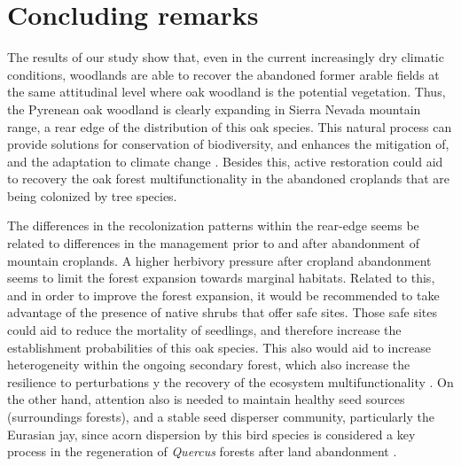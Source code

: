 \section{Concluding remarks}\label{sec:coloniza:Conclusion}
The results of our study show that, even in the current increasingly dry climatic conditions, \Qp woodlands are able to recover the abandoned former arable fields at the same attitudinal level where oak woodland is the potential vegetation. Thus, the Pyrenean oak woodland is clearly expanding in Sierra Nevada mountain range, a rear edge of the distribution of this oak species. This natural process can provide solutions for conservation of biodiversity, and enhances the mitigation of, and the adaptation to climate change \autocites[][and references therein]{Chazdonetal2020FosteringNatural}. Besides this, active restoration could aid to recovery the oak forest multifunctionality \autocite{CruzAlonsoetal2019LongTerm} in the abandoned croplands that are being colonized by tree species.

The differences in the recolonization patterns within the rear-edge seems be related to differences in the management prior to and after abandonment of mountain croplands. A higher herbivory pressure after cropland abandonment seems to limit the forest expansion towards marginal habitats. Related to this, and in order to improve the forest expansion, it would be recommended to take advantage of the presence of native shrubs that offer safe sites. Those safe sites could aid to reduce the mortality of \Qp seedlings, and therefore increase the establishment probabilities of this oak species. This also would aid to increase heterogeneity within the ongoing secondary forest, which also increase the resilience to perturbations y the recovery of the ecosystem multifunctionality \autocite{Stritihetal2021ImpactLanduse, CruzAlonsoetal2019LongTerm}. On the other hand, attention also is needed to maintain healthy seed sources (surroundings forests), and a stable seed disperser community, particularly the Eurasian jay, since acorn dispersion by this bird species is considered a key process in the regeneration of \emph{Quercus} forests after land abandonment \autocite{Pausasetal2006RegenerationMarginal}.
